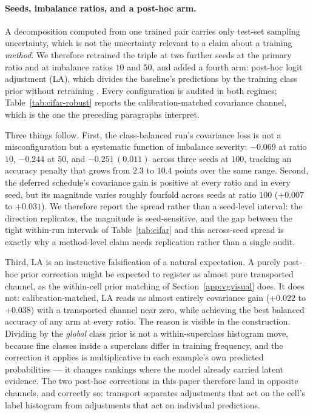 \paragraph{Seeds, imbalance ratios, and a post-hoc arm.} A decomposition computed from
one trained pair carries only test-set sampling uncertainty, which is not the uncertainty
relevant to a claim about a training \emph{method}. We therefore retrained the triple at
two further seeds at the primary ratio and at imbalance ratios $10$ and $50$, and added a
fourth arm: post-hoc logit adjustment (LA), which divides the baseline's predictions by
the training class prior without retraining \citep{menon2021long}. Every configuration is
audited in both regimes; Table~\ref{tab:cifar-robust} reports the calibration-matched
covariance channel, which is the one the preceding paragraphs interpret.

Three things follow. First, the class-balanced run's covariance loss is not a
misconfiguration but a systematic function of imbalance severity: $-0.069$ at ratio $10$,
$-0.244$ at $50$, and $-0.251\,(0.011)$ across three seeds at $100$, tracking an accuracy
penalty that grows from $2.3$ to $10.4$ points over the same range. Second, the deferred
schedule's covariance gain is positive at every ratio and in every seed, but its magnitude
varies roughly fourfold across seeds at ratio $100$ ($+0.007$ to $+0.031$). We therefore
report the spread rather than a seed-level interval: the direction replicates, the
magnitude is seed-sensitive, and the gap between the tight within-run intervals of
Table~\ref{tab:cifar} and this across-seed spread is exactly why a method-level claim
needs replication rather than a single audit.

Third, LA is an instructive falsification of a natural expectation. A purely post-hoc
prior correction might be expected to register as almost pure transported channel, as the
within-cell prior matching of Section~\ref{app:vgvisual} does. It does not:
calibration-matched, LA reads as almost entirely covariance gain ($+0.022$ to $+0.038$) with a
transported channel near zero, while achieving the best balanced accuracy of any arm at every
ratio. The reason is visible in the construction. Dividing by the \emph{global} class
prior is not a within-superclass histogram move, because fine classes inside a superclass
differ in training frequency, and the correction it applies is multiplicative in each
example's own predicted probabilities --- it changes rankings where the model already
carried latent evidence. The two post-hoc corrections in this paper therefore land in
opposite channels, and correctly so: transport separates adjustments that act on the
cell's label histogram from adjustments that act on individual predictions.

